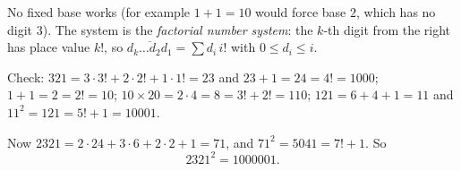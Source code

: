 No fixed base works (for example $1+1=10$ would force base $2$, which has no digit $3$). The system is the \emph{factorial number system}: the $k$-th digit from the right has place value $k!$, so $\overline{d_k\ldots d_2d_1}=\sum d_i\,i!$ with $0\le d_i\le i$.

Check: $321=3\cdot3!+2\cdot2!+1\cdot1!=23$ and $23+1=24=4!=1000$; $1+1=2=2!=10$; $10\times20=2\cdot4=8=3!+2!=110$; $121=6+4+1=11$ and $11^2=121=5!+1=10001$.

Now $2321=2\cdot24+3\cdot6+2\cdot2+1=71$, and $71^2=5041=7!+1$. So
\[
2321^2=\boxed{1000001}.
\]
